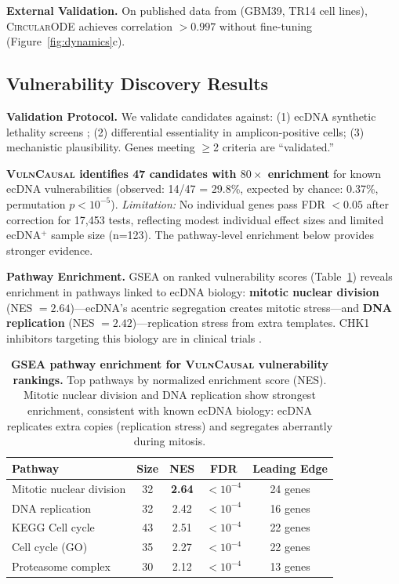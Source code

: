 \documentclass[sigconf,anonymous]{acmart}
\newcommand{\circularode}{\textsc{CircularODE}}
\newcommand{\vulncausal}{\textsc{VulnCausal}}
\begin{document}
\textbf{External Validation.} On published data from \citet{lange_2022_mathematical} (GBM39, TR14 cell lines), \circularode{} achieves correlation $>0.997$ without fine-tuning (Figure~\ref{fig:dynamics}c).

\subsection{Vulnerability Discovery Results}

\textbf{Validation Protocol.} We validate candidates against: (1) ecDNA synthetic lethality screens \cite{yi_2024_chk1_ecdna}; (2) differential essentiality in amplicon-positive cells; (3) mechanistic plausibility. Genes meeting $\geq$2 criteria are ``validated.''

\textbf{\vulncausal{} identifies 47 candidates with $80\times$ enrichment} for known ecDNA vulnerabilities (observed: 14/47 = 29.8\%, expected by chance: 0.37\%, permutation $p < 10^{-5}$). \textit{Limitation:} No individual genes pass FDR $< 0.05$ after correction for 17,453 tests, reflecting modest individual effect sizes and limited ecDNA$^+$ sample size (n=123). The pathway-level enrichment below provides stronger evidence.

\textbf{Pathway Enrichment.} GSEA \cite{subramanian_2005_gsea} on ranked vulnerability scores (Table~\ref{tab:gsea}) reveals enrichment in pathways linked to ecDNA biology: \textbf{mitotic nuclear division} (NES $= 2.64$)---ecDNA's acentric segregation creates mitotic stress---and \textbf{DNA replication} (NES $= 2.42$)---replication stress from extra templates. CHK1 inhibitors targeting this biology are in clinical trials \cite{yi_2024_chk1_ecdna}.

\begin{table}[h]
\caption{\textbf{GSEA pathway enrichment for \vulncausal{} vulnerability rankings.} Top pathways by normalized enrichment score (NES). Mitotic nuclear division and DNA replication show strongest enrichment, consistent with known ecDNA biology: ecDNA replicates extra copies (replication stress) and segregates aberrantly during mitosis.}
\label{tab:gsea}
\centering
\small
\begin{tabular}{@{}lcccc@{}}
\toprule
Pathway & Size & NES & FDR & Leading Edge \\
\midrule
Mitotic nuclear division & 32 & \textbf{2.64} & $<10^{-4}$ & 24 genes \\
DNA replication & 32 & 2.42 & $<10^{-4}$ & 16 genes \\
KEGG Cell cycle & 43 & 2.51 & $<10^{-4}$ & 22 genes \\
Cell cycle (GO) & 35 & 2.27 & $<10^{-4}$ & 22 genes \\
Proteasome complex & 30 & 2.12 & $<10^{-4}$ & 13 genes \\
\bottomrule
\end{tabular}
\end{table}
\end{document}

